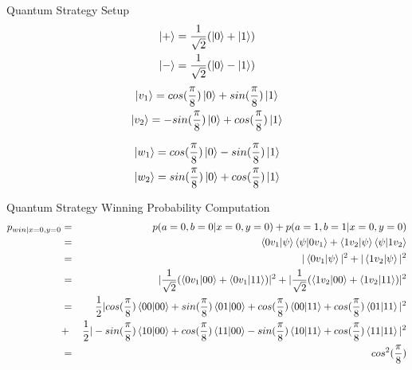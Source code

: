 \documentclass[handout, 10 pt]{beamer}
\begin{document}
\begin{frame}{Quantum Strategy Setup}
\begin{gather*}
    \ket{+}=\frac{1}{\sqrt{2}}(\ket{0}+\ket{1})\\
    \ket{-}=\frac{1}{\sqrt{2}}(\ket{0}-\ket{1})\\
\end{gather*}
\begin{gather*}
    \ket{v_1}=cos(\frac{\pi}{8})\ket{0}+sin(\frac{\pi}{8})\ket{1}\\
    \ket{v_2}=-sin(\frac{\pi}{8})\ket{0}+cos(\frac{\pi}{8})\ket{1}\\  
\end{gather*}

\begin{gather*}    
    \ket{w_1}=cos(\frac{\pi}{8})\ket{0}-sin(\frac{\pi}{8})\ket{1}\\
    \ket{w_2}=sin(\frac{\pi}{8})\ket{0}+cos(\frac{\pi}{8})\ket{1}
\end{gather*}    
\end{frame}

\begin{frame}{Quantum Strategy Winning Probability Computation}
\begin{eqnarray*}
p_{win|x=0,y=0}&=&p(a=0, b=0|x=0, y=0)+p(a=1, b=1|x=0, y=0)\\
&=&\braket{0 v_1|\psi}\braket{\psi|0v_1}+\braket{1 v_2|\psi}\braket{\psi|1v_2}\\
&=&|\braket{0 v_1|\psi}|^2 + |\braket{1 v_2|\psi}|^2\\
&=&|\frac{1}{\sqrt{2}}(\braket{0v_1|00}+\braket{0v_1|11})|^2+|\frac{1}{\sqrt{2}}(\braket{1v_2|00}+\braket{1v_2|11})|^2\\
&=&\frac{1}{2}|cos(\frac{\pi}{8})\braket{00|00}+sin(\frac{\pi}{8})\braket{01|00}+cos(\frac{\pi}{8})\braket{00|11}+cos(\frac{\pi}{8})\braket{01|11}|^2\\
&+&\frac{1}{2}|-sin(\frac{\pi}{8})\braket{10|00}+cos(\frac{\pi}{8})\braket{11|00}-sin(\frac{\pi}{8})\braket{10|11}+cos(\frac{\pi}{8})\braket{11|11}|^2\\
&=&cos^2(\frac{\pi}{8})
\end{eqnarray*}
\end{frame}
\end{document}
